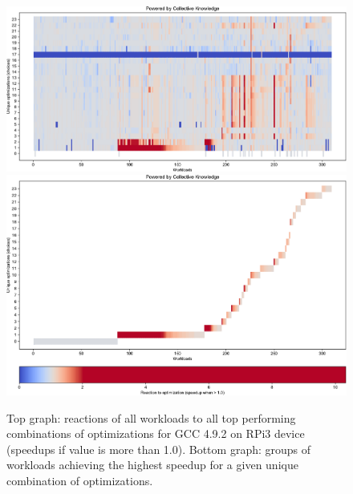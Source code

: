    \begin{figure}[!htbp]
     \centering
      \includegraphics[width=6.6in]
      {ck-assets/ba5ecb7074b4985a-cropped.pdf} %
      \includegraphics[width=6.6in]
      {ck-assets/8cb40f9e0ee52bcd-cropped.pdf} %
     \caption{
       Top graph: reactions of all workloads 
          to all top performing combinations of optimizations
          for GCC 4.9.2 on RPi3 device (speedups if value is more than 1.0).
       Bottom graph: groups of workloads achieving the highest speedup
          for a given unique combination of optimizations.
     }
     \label{fig:ck-reactions-gcc4}
   \end{figure}

